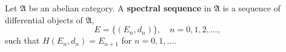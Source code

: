Let $\mathfrak{A}$ be an abelian category. A \textbf{spectral sequence} in $\mathfrak{A}$ is a sequence of differential objects of $\mathfrak{A}$,
$$E = \{(E_n, d_n)\}, \quad n = 0, 1, 2, \ldots,$$
such that $H(E_n, d_n) = E_{n+1}$ for $n = 0, 1, \ldots$.
